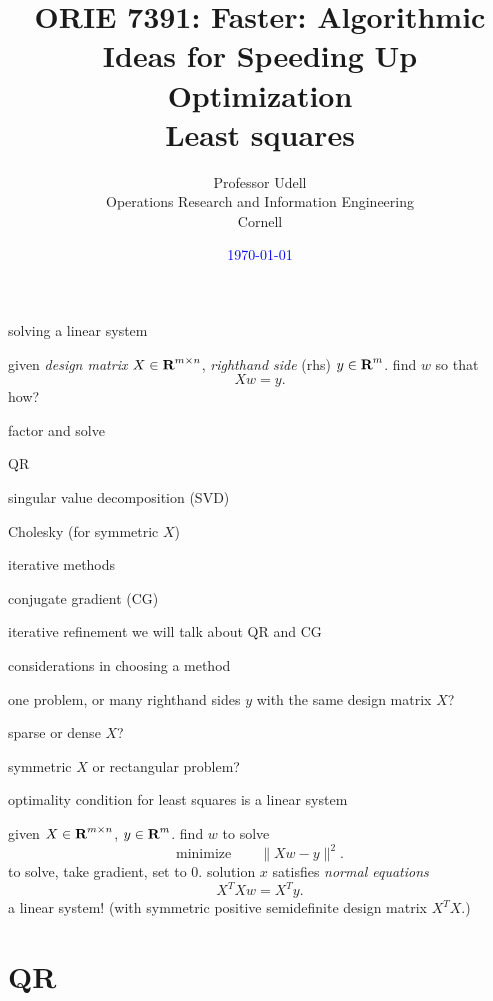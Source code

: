 \documentclass[presentation,xcolor={usenames,dvipsnames}]{beamer}
\title{ORIE 7391: Faster: Algorithmic Ideas for Speeding Up Optimization\\[2ex]
       Least squares}
\date{\textcolor{blue}{\today}}
\author{Professor Udell \\[1ex]
Operations Research and Information Engineering \\
Cornell}
\begin{document}
\begin{frame}
\titlepage
\end{frame}

\begin{frame}{solving a linear system}

given \emph{design matrix} $X \in {\mbox{\bf R}}^{m\times n}$, \emph{righthand side} (rhs) $y \in {\mbox{\bf R}}^m$. find $w$ so that
\[
Xw = y.
\]
\pause
how?
\bit
\item factor and solve
\bit
\item QR
\item singular value decomposition (SVD)
\item Cholesky (for symmetric $X$)
\eit
\item iterative methods
\bit
\item conjugate gradient (CG)
\item iterative refinement
\eit
\eit
we will talk about QR and CG

\end{frame}

\begin{frame}{considerations in choosing a method}

  \bit
  \item one problem, or many righthand sides $y$ with the same design matrix $X$?
  \item sparse or dense $X$?
  \item symmetric $X$ or rectangular problem?
  \eit

\end{frame}

\begin{frame}{optimality condition for least squares is a linear system}

given $X \in {\mbox{\bf R}}^{m\times n}$, $y \in {\mbox{\bf R}}^m$. find $w$ to solve
\[
\mbox{minimize} \qquad \|Xw - y\|^2.
\]
to solve, take gradient, set to 0. solution $x$ satisfies \emph{normal equations}
\[
X^T X w = X^T y.
\]
a linear system! (with symmetric positive semidefinite design matrix $X^T X$.)

\end{frame}

\section{QR}
\end{document}
